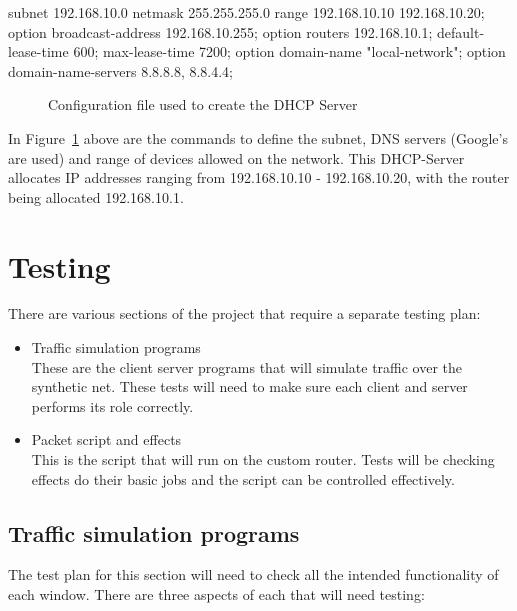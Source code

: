 \begin{center}
\begin{Scripts}{}
subnet 192.168.10.0 netmask 255.255.255.0 {
	range 192.168.10.10 192.168.10.20;
 	option broadcast-address 192.168.10.255;
 	option routers 192.168.10.1;
 	default-lease-time 600;
 	max-lease-time 7200;
 	option domain-name "local-network";
 	option domain-name-servers 8.8.8.8, 8.8.4.4;
}
\end{Scripts}
\begin{figure}[h]
	\caption{Configuration file used to create the DHCP Server}
	\label{ref:dhcp-server}
\end{figure}
\end{center}

In Figure~\ref{ref:dhcp-server} above are the commands to define the subnet, DNS servers (Google's are used) and range of devices allowed on the network. This DHCP-Server allocates IP addresses ranging from 192.168.10.10 - 192.168.10.20, with the router being allocated 192.168.10.1.


\section{Testing}
There are various sections of the project that require a separate testing plan:

\begin{itemize}

	\item Traffic simulation programs\\
	These are the client server programs that will simulate traffic over the synthetic net. These tests will need to 	make 	sure each client and server performs its role correctly.
	
	\item Packet script and effects\\
	This is the script that will run on the custom router. Tests will be checking effects do their basic jobs and the script can be controlled effectively.
	
\end{itemize}

\subsection{Traffic simulation programs}
The test plan for this section will need to check all the intended functionality of each window. There are three aspects of each that will need testing:

